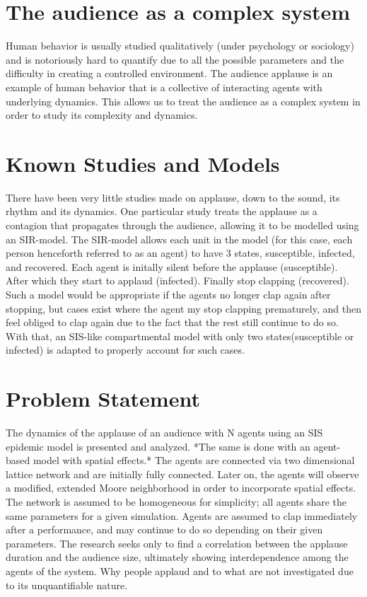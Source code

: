 \section{The audience as a complex system}
\hspace{\parindent} Human behavior is usually studied qualitatively (under psychology or sociology) and is notoriously hard to quantify due to all the possible parameters and the difficulty in creating a controlled environment.
The audience applause is an example of human behavior that is a collective of interacting agents with underlying dynamics.
This allows us to treat the audience as a complex system in order to study its complexity and dynamics.
 

\section{Known Studies and Models}
There have been very little studies made on applause, down to the sound, its rhythm and its dynamics. 
One particular study treats the applause as a contagion that propagates through the audience, allowing it to be modelled using an SIR-model.
The SIR-model allows each unit in the model (for this case, each person henceforth referred to as an agent) to have 3 states, susceptible, infected, and recovered. 
Each agent is initally silent before the applause (susceptible).
After which they start to applaud (infected).
Finally stop clapping (recovered).
Such a model would be appropriate if the agents no longer clap again after stopping, but cases exist where the agent my stop clapping prematurely, and then feel obliged to clap again due to the fact that the rest still continue to do so.
With that, an SIS-like compartmental model with only two states(susceptible or infected) is adapted to properly account for such cases.

\section{Problem Statement}

The dynamics of the applause of an audience with N agents using an SIS epidemic model is presented and analyzed. 
*The same is done with an agent-based model with spatial effects.*
The agents are connected via two dimensional lattice network and are initially fully connected.
Later on, the agents will observe a modified, extended Moore neighborhood in order to incorporate spatial effects.
The network is assumed to be homogeneous for simplicity; all agents share the same parameters for a given simulation.
Agents are assumed to clap immediately after a performance, and may continue to do so depending on their given parameters.
The research seeks only to find a correlation between the applause duration and the audience size, ultimately showing interdependence among the agents of the system.
Why people applaud and to what are not investigated due to its unquantifiable nature.

  






